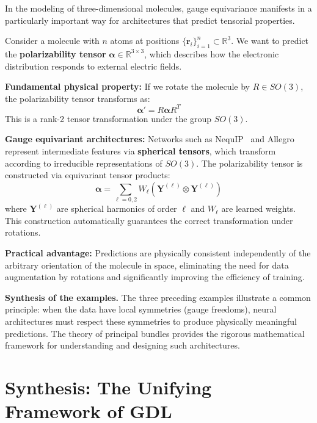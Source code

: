 \begin{example}\label{ex:gauge_moleculas}
In the modeling of three-dimensional molecules, gauge equivariance manifests in a particularly important way for architectures that predict tensorial properties.

Consider a molecule with $n$ atoms at positions $\{\mathbf{r}_i\}_{i=1}^n \subset \mathbb{R}^3$. We want to predict the \textbf{polarizability tensor} $\boldsymbol{\alpha} \in \mathbb{R}^{3 \times 3}$, which describes how the electronic distribution responds to external electric fields.

\textbf{Fundamental physical property:} If we rotate the molecule by $R \in SO(3)$, the polarizability tensor transforms as:
\begin{equation}
\boldsymbol{\alpha}' = R \boldsymbol{\alpha} R^T
\end{equation}
This is a rank-2 tensor transformation under the group $SO(3)$.

\textbf{Gauge equivariant architectures:} Networks such as NequIP~\citep{batzner2022nequip} and Allegro represent intermediate features via \textbf{spherical tensors}, which transform according to irreducible representations of $SO(3)$. The polarizability tensor is constructed via equivariant tensor products:
\begin{equation}
\boldsymbol{\alpha} = \sum_{\ell=0,2} W_\ell \left( \mathbf{Y}^{(\ell)} \otimes \mathbf{Y}^{(\ell)} \right)
\end{equation}
where $\mathbf{Y}^{(\ell)}$ are spherical harmonics of order $\ell$ and $W_\ell$ are learned weights. This construction automatically guarantees the correct transformation under rotations.

\textbf{Practical advantage:} Predictions are physically consistent independently of the arbitrary orientation of the molecule in space, eliminating the need for data augmentation by rotations and significantly improving the efficiency of training.
\end{example}

\textbf{Synthesis of the examples.} The three preceding examples illustrate a common principle: when the data have local symmetries (gauge freedoms), neural architectures must respect these symmetries to produce physically meaningful predictions. The theory of principal bundles provides the rigorous mathematical framework for understanding and designing such architectures.


\section{Synthesis: The Unifying Framework of GDL}\label{sec:sintesis_marco_unificador}

